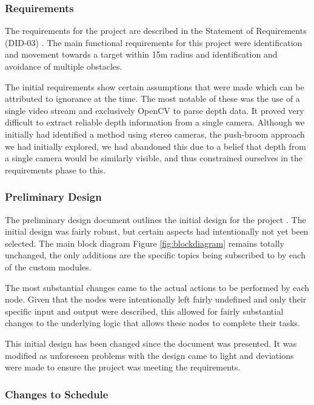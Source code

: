 \documentclass{article}[12]
\begin{document}
		\subsubsection{Requirements}
		
		The requirements for the project are described in the Statement of Requirements (DID-03) \cite{sor}. The main functional requirements for this project were identification and movement towards a target within 15m radius and identification and avoidance of multiple obstacles. 
	
		The initial requirements show certain assumptions that were made which can be attributed to ignorance at the time. The most notable of these was the use of a single video stream and exclusively OpenCV to parse depth data. It proved very difficult to extract reliable depth information from a single camera. Although we initially had identified a method using stereo cameras, the push-broom approach \cite{barry2015pushbroom} we had initially explored, we had abandoned this due to a belief that depth from a single camera would be similarly visible, and thus constrained ourselves in the requirements phase to this.

		\subsubsection{Preliminary Design}
		
		The preliminary design document outlines the initial design for the project \cite{pdd}. The initial design was fairly robust, but certain aspects had intentionally not yet been selected. The main block diagram Figure \ref{fig:blockdiagram} remains totally unchanged, the only additions are the specific topics being subscribed to by each of the custom modules. 
		
		The most substantial changes came to the actual actions to be performed by each node. Given that the nodes were intentionally left fairly undefined and only their specific input and output were described, this allowed for fairly substantial changes to the underlying logic that allows these nodes to complete their tasks.


This initial design has been changed since the document was presented. It was modified as unforeseen problems with the design came to light and deviations were made to ensure the project was meeting the requirements.


		\subsubsection{Changes to Schedule}
	
\end{document}
